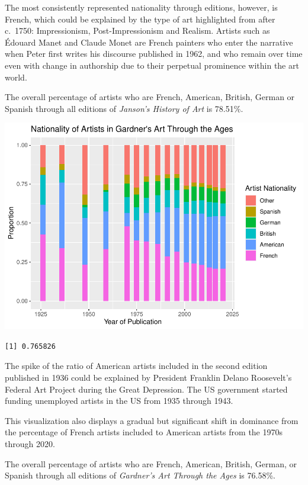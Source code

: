 \documentclass[
  letterpaper,
  DIV=11,
  numbers=noendperiod]{scrreprt}
\begin{document}
The most consistently represented nationality through editions, however,
is French, which could be explained by the type of art highlighted from
after c.~1750: Impressionism, Post-Impressionism and Realism. Artists
such as Édouard Manet and Claude Monet are French painters who enter the
narrative when Peter first writes his discourse published in 1962, and
who remain over time even with change in authorship due to their
perpetual prominence within the art world.

The overall percentage of artists who are French, American, British,
German or Spanish through all editions of \emph{Janson's History of Art}
is 78.51\%.

\includegraphics{Chapter1/Chapter1_files/figure-pdf/gardnernationalitythroughtime-1.pdf}

\begin{verbatim}
[1] 0.765826
\end{verbatim}

The spike of the ratio of American artists included in the second
edition published in 1936 could be explained by President Franklin
Delano Roosevelt's Federal Art Project during the Great Depression. The
US government started funding unemployed artists in the US from 1935
through 1943.

This visualization also displays a gradual but significant shift in
dominance from the percentage of French artists included to American
artists from the 1970s through 2020.

The overall percentage of artists who are French, American, British,
German, or Spanish through all editions of \emph{Gardner's Art Through
the Ages} is 76.58\%.
\end{document}
